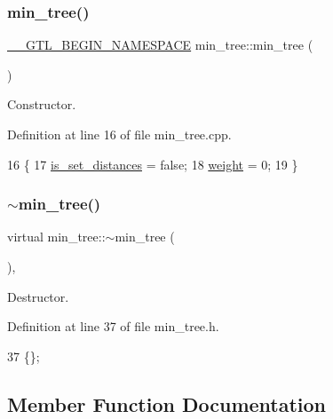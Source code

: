 \subsubsection{\texorpdfstring{min\+\_\+tree()}{min\_tree()}}
{\footnotesize\ttfamily \mbox{\hyperlink{_g_t_l_8h_a2d9f24096ac60918452dd51f32b64aa9}{\+\_\+\+\_\+\+G\+T\+L\+\_\+\+B\+E\+G\+I\+N\+\_\+\+N\+A\+M\+E\+S\+P\+A\+CE}} min\+\_\+tree\+::min\+\_\+tree (\begin{DoxyParamCaption}{ }\end{DoxyParamCaption})}



Constructor. 



Definition at line 16 of file min\+\_\+tree.\+cpp.


\begin{DoxyCode}
16                     \{ 
17     \mbox{\hyperlink{classmin__tree_a7c2ec16bd1799571bc057630262a3a03}{is\_set\_distances}} = \textcolor{keyword}{false};
18     \mbox{\hyperlink{classmin__tree_a52112da027b950d45c177117444c5010}{weight}} = 0;
19 \}
\end{DoxyCode}
\mbox{\label{classmin__tree_a0df992f77a8656121777aa2c0380a67a}} 
\subsubsection{\texorpdfstring{$\sim$min\+\_\+tree()}{~min\_tree()}}
{\footnotesize\ttfamily virtual min\+\_\+tree\+::$\sim$min\+\_\+tree (\begin{DoxyParamCaption}{ }\end{DoxyParamCaption})\hspace{0.3cm}{\ttfamily [inline]}, {\ttfamily [virtual]}}



Destructor. 



Definition at line 37 of file min\+\_\+tree.\+h.


\begin{DoxyCode}
37 \{\};
\end{DoxyCode}


\subsection{Member Function Documentation}
\mbox{\label{classmin__tree_ad87b1bfbc687ad943c07538fa0c3d270}} 
